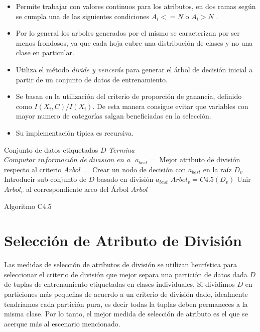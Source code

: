 \begin{itemize}
	\item Permite trabajar con valores continuos para los atributos, en dos ramas según se cumpla una de las siguientes condiciones  $ A_{i} <= N $ o $ A_{i} > N $ . 
	\item Por lo general los arboles generados por el mismo se caracterizan por ser menos frondosos, ya que cada hoja cubre una distribución de clases y no una clase en particular.
	\item Utiliza el método \emph{divide y vencerás} para generar el árbol de decisión inicial a partir de un conjunto de datos de entrenamiento.
	\item Se basan en la utilización del criterio de proporción de ganancia, definido como $ I(X_{i},C) / I(X_{i})  $. De esta manera consigue evitar que variables con mayor numero de categorías salgan beneficiadas en la selección. 
	\item Su implementación típica es recursiva.
\end{itemize}

\begin{algorithm}
	\begin{algorithmic}[1]
		\Require Conjunto de datos etiquetados $D$
				\State\textit{Termina}
			\EndIf
				\State $\textit{Computar información de division en a }$
			\EndFor
			\State $ a_{best} =$ Mejor atributo de división respecto al criterio 
			\State $ Arbol =$ Crear un nodo de decisión con $ a_{best} $ en la raíz 
			\State $ D_{v} =$ Introducir sub-conjunto de $D$ basado en división $ a_{best} $
				\State $ Arbol_{v} = C4.5(D_{v}) $
				\State Unir $ Arbol_{v} $ al correspondiente arco del Árbol
			\EndFor
			\State 
			\Return $ Arbol $
		\EndProcedure
	\end{algorithmic}
	\caption{\label{algoC45}Algoritmo C4.5}
\end{algorithm}


\section{Selección de Atributo de División}
Las medidas de selección de atributos de división se utilizan heurística para seleccionar el criterio de división que mejor separa una partición de datos dada $D$ de tuplas de entrenamiento etiquetadas en clases individuales. Si dividimos $D$ en particiones más pequeñas de acuerdo a un criterio de división dado, idealmente tendríamos cada partición pura, es decir todas la tuplas deben permaneces a la misma clase. Por lo tanto, el mejor medida de selección de atributo es el que se acerque más al escenario mencionado.

